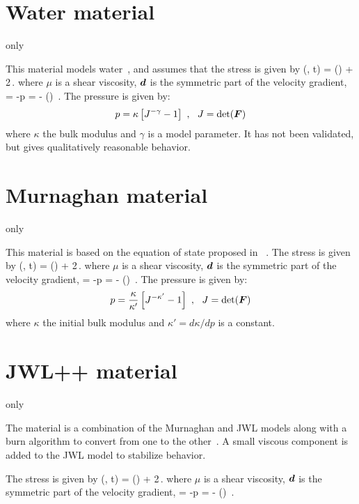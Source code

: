 \section{Water material}
  \MPM only

This material models water~\cite{water_model_ref}, and assumes that the stress is given by
\Beq
  \Bsig(\BF, t) = \pbar(\BF) \BI + 2\mu\,\Beta.
\Eeq
where $\mu$ is a shear viscosity, $\boldsymbol{d}$ is the symmetric part of the velocity gradient,
\Beq
  \pbar = -p \quad \Tand \quad \Beta = \BdT - \Third \Tr(\BdT) \BI \,.
\Eeq
The pressure is given by:
\begin{equation}
  p = \kappa\left[J^{-\gamma} - 1\right] ~,~~ J = \det(\boldsymbol{F})
\end{equation}
where $\kappa$ the bulk modulus and $\gamma$ is a model parameter.  
It has not been validated, but gives qualitatively reasonable behavior.

\section{Murnaghan material}
  \MPM only

This material is based on the equation of state proposed in ~\cite{Murnaghan1944}.
The stress is given by
\Beq
  \Bsig(\BF, t) = \pbar(\BF) \BI + 2\mu\,\Beta.
\Eeq
where $\mu$ is a shear viscosity, $\boldsymbol{d}$ is the symmetric part of the velocity gradient,
\Beq
  \pbar = -p \quad \Tand \quad \Beta = \BdT - \Third \Tr(\BdT) \BI \,.
\Eeq
The pressure is given by:
\begin{equation}
  p = \frac{\kappa}{\kappa'}\left[J^{-\kappa'} - 1\right] ~,~~ J = \det(\boldsymbol{F})
\end{equation}
where $\kappa$ the initial bulk modulus and $\kappa' = d\kappa/dp$ is a constant.

\section{JWL++ material}
  \MPM only

The  material is a combination of the Murnaghan and JWL models
along with a burn algorithm to convert from one to the other~\cite{JWL2000}. 
A small viscous component is added to the JWL model to stabilize behavior.

The stress is given by
\Beq
  \Bsig(\BF, t) = \pbar(\BF) \BI + 2\mu\,\Beta.
\Eeq
where $\mu$ is a shear viscosity, $\boldsymbol{d}$ is the symmetric part of the velocity gradient,
\Beq
  \pbar = -p \quad \Tand \quad \Beta = \BdT - \Third \Tr(\BdT) \BI \,.
\Eeq

